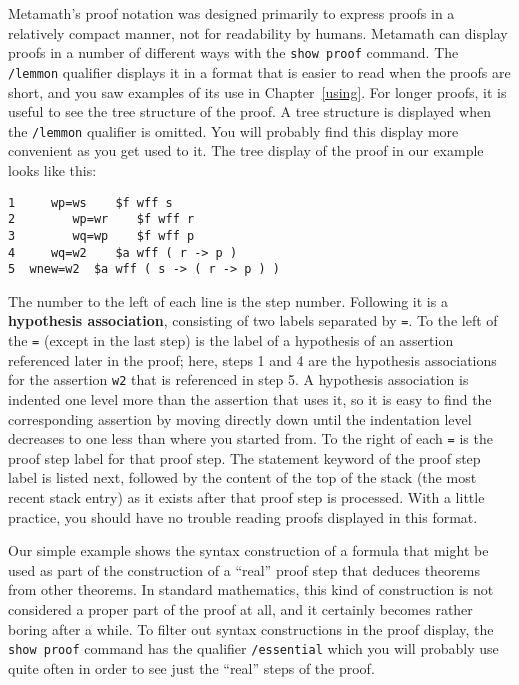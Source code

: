 Metamath's proof notation was designed primarily to express proofs in a
relatively compact manner, not for readability by humans.  Metamath can display
proofs in a number of different ways with the \texttt{show proof} command.  The
\texttt{/lemmon} qualifier displays it in a format that is easier to read when the
proofs are short, and you saw examples of its use in Chapter~\ref{using}.  For
longer proofs, it is useful to see the tree structure of the proof.  A tree
structure is displayed when the \texttt{/lemmon} qualifier is omitted.  You will
probably find this display more convenient as you get used to it. The tree
display of the proof in our example looks like
this:\label{treeproof}
\begin{verbatim}
1     wp=ws    $f wff s
2        wp=wr    $f wff r
3        wq=wp    $f wff p
4     wq=w2    $a wff ( r -> p )
5  wnew=w2  $a wff ( s -> ( r -> p ) )
\end{verbatim}
The number to the left of each line is the step number.  Following it is a
{\bf hypothesis association}, consisting of two
labels separated by \texttt{=}.  To the left of the \texttt{=} (except
in the last step) is the label of a hypothesis of an assertion referenced
later in the proof; here, steps 1 and 4 are the hypothesis associations for
the assertion \texttt{w2} that is referenced in step 5.  A hypothesis association
is indented one level more than the assertion that uses it, so it is easy to
find the corresponding assertion by moving directly down until the indentation
level decreases to one less than where you started from.  To the right of each
\texttt{=} is the proof step label for that proof step.  The statement keyword of
the proof step label is listed next, followed by the content of the top of the
stack (the most recent stack entry) as it exists after that proof step is
processed.  With a little practice, you should have no trouble reading proofs
displayed in this format.

Our simple example shows the syntax construction of a formula that might be
used as part of the construction of a ``real'' proof step that deduces
theorems from other theorems.  In standard mathematics, this kind of
construction is not considered a proper part of the proof at all, and it
certainly becomes rather boring after a while.  To filter out syntax
constructions in the proof display, the \texttt{show proof} command has the qualifier \texttt{/essential} which you will probably
use quite often in order to see just the ``real'' steps of
the proof.

